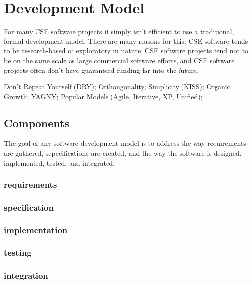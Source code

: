 \documentclass[12pt,relax]{article}
\begin{document}
\clearpage


\section{Development Model}
\label{Section:Development Model}

For many CSE software projects it simply isn't efficient to use a traditional, 
formal development model.  There are many reasons for this:  CSE software tends
to be research-based or exploratory in nature, CSE software projects tend not
to be on the same scale as large commercial software efforts, and CSE software 
projects often don't have guaranteed funding far into the future.

Don't Repeat Yourself (DRY);
Orthongonality;
Simplicity (KISS);
Organic Growth;
YAGNY;
Popular Models (Agile, Iterative, XP, Unified);

\subsection{Components}
  
  The goal of any software development model is to address the way requirements
  are gathered, sepecifications are created, and the way the software is
  designed, implemented, tested, and integrated.
  
  \subsubsection{requirements}
  
  \subsubsection{specification}
  
  \subsubsection{implementation}
  
  \subsubsection{testing}
  
  \subsubsection{integration}
  
\end{document}
